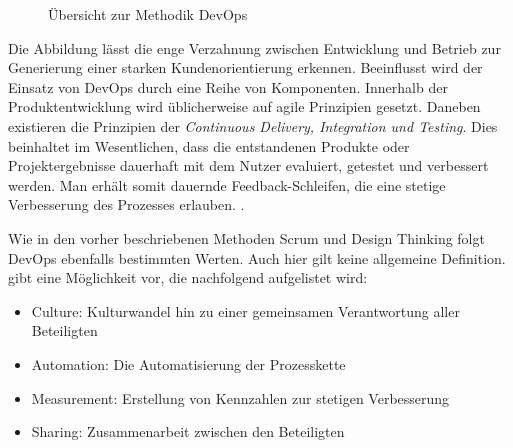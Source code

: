 \begin{figure}[H]
	\centering
	\caption[Übersicht zur Methodik DevOps]{Übersicht zur Methodik DevOps \protect \cite[S. 28]{alt_innovationsorientiertes_2017}}
	\label{fig:devops}
\end{figure}

Die Abbildung lässt die enge Verzahnung zwischen Entwicklung und Betrieb zur Generierung einer starken Kundenorientierung erkennen. Beeinflusst wird der Einsatz von DevOps durch eine Reihe von Komponenten. Innerhalb der Produktentwicklung wird üblicherweise auf agile Prinzipien gesetzt. Daneben existieren die Prinzipien der \textit{Continuous Delivery, Integration und Testing}. Dies beinhaltet im Wesentlichen, dass die entstandenen Produkte oder Projektergebnisse dauerhaft mit dem Nutzer evaluiert, getestet und verbessert werden. Man erhält somit dauernde Feedback-Schleifen, die eine stetige Verbesserung des Prozesses erlauben. \cite{alt_innovationsorientiertes_2017}.

Wie in den vorher beschriebenen Methoden Scrum und Design Thinking folgt DevOps ebenfalls bestimmten Werten. Auch hier gilt keine allgemeine Definition.  gibt eine Möglichkeit vor, die nachfolgend aufgelistet wird:

\begin{itemize}[noitemsep, topsep=0pt]
	\item Culture: Kulturwandel hin zu einer gemeinsamen Verantwortung aller Beteiligten
	\item Automation: Die Automatisierung der Prozesskette
	\item Measurement: Erstellung von Kennzahlen zur stetigen Verbesserung
	\item Sharing: Zusammenarbeit zwischen den Beteiligten
\end{itemize}

